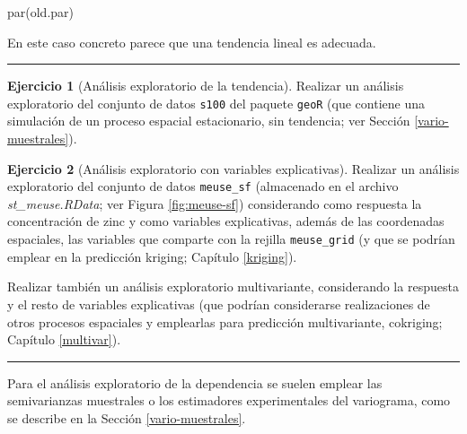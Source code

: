 \documentclass[
  spanish,
]{book}
\newenvironment{Shaded}{\begin{snugshade}}{\end{snugshade}}
\newcommand{\FunctionTok}[1]{\textcolor[rgb]{0.00,0.00,0.00}{#1}}
\newcommand{\NormalTok}[1]{#1}
\theoremstyle{break}
\theoremstyle{definition}
\theoremstyle{definition}
\theoremstyle{definition}
\newtheorem{exercise}{Ejercicio}[chapter]
\theoremstyle{definition}
\theoremstyle{remark}
\begin{document}
\begin{Shaded}
\begin{Highlighting}[]
\FunctionTok{par}\NormalTok{(old.par)}
\end{Highlighting}
\end{Shaded}

En este caso concreto parece que una tendencia lineal es adecuada.

\begin{center}\rule{0.5\linewidth}{0.5pt}\end{center}

\begin{exercise}[Análisis exploratorio de la tendencia]
\protect\hypertarget{exr:descriptiva}{}{\label{exr:descriptiva} {} }
Realizar un análisis exploratorio del conjunto de datos \texttt{s100} del paquete \texttt{geoR}
(que contiene una simulación de un proceso espacial estacionario, sin tendencia;
ver Sección \ref{vario-muestrales}).
\end{exercise}

\begin{exercise}[Análisis exploratorio con variables explicativas]
\protect\hypertarget{exr:descriptiva2}{}{\label{exr:descriptiva2} {} }
Realizar un análisis exploratorio del conjunto de datos \texttt{meuse\_sf} (almacenado en
el archivo \emph{st\_meuse.RData}; ver Figura \ref{fig:meuse-sf}) considerando como
respuesta la concentración de zinc y como variables explicativas, además de las
coordenadas espaciales, las variables que comparte con la rejilla \texttt{meuse\_grid}
(y que se podrían emplear en la predicción kriging; Capítulo \ref{kriging}).

Realizar también un análisis exploratorio multivariante, considerando la respuesta
y el resto de variables explicativas (que podrían considerarse realizaciones de
otros procesos espaciales y emplearlas para predicción multivariante, cokriging;
Capítulo \ref{multivar}).
\end{exercise}

\begin{center}\rule{0.5\linewidth}{0.5pt}\end{center}

Para el análisis exploratorio de la dependencia se suelen emplear las semivarianzas muestrales o los estimadores experimentales del variograma, como se describe en la Sección \ref{vario-muestrales}.
\end{document}
